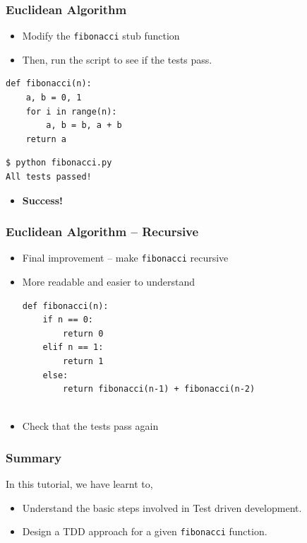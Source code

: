 \documentclass[12pt,presentation]{beamer}
\providecommand{\alert}[1]{\textbf{#1}}
\begin{document}
\begin{frame}[fragile]
  \frametitle{Euclidean Algorithm}
  \begin{itemize}
  \item Modify the \texttt{fibonacci} stub function
  \item Then, run the script to see if the tests pass.
  \end{itemize}
\begin{lstlisting}
def fibonacci(n):
    a, b = 0, 1
    for i in range(n):
        a, b = b, a + b
    return a

\end{lstlisting}
\begin{lstlisting}
$ python fibonacci.py
All tests passed!
\end{lstlisting} %
  \begin{itemize}
  \item \alert{Success!}
  \end{itemize}
\end{frame}

\begin{frame}[fragile]
  \frametitle{Euclidean Algorithm -- Recursive}
  \begin{itemize}
  \item Final improvement -- make \texttt{fibonacci} recursive
  \item More readable and easier to understand
\begin{lstlisting}
def fibonacci(n):
    if n == 0:
        return 0
    elif n == 1:
        return 1
    else:
        return fibonacci(n-1) + fibonacci(n-2)
        
\end{lstlisting}
  \item Check that the tests pass again
  \end{itemize}
\end{frame}


\begin{frame}
\frametitle{Summary}
\label{sec-8}

  In this tutorial, we have learnt to,


\begin{itemize}
\item Understand the basic steps involved in Test driven development.
\item Design a TDD approach for a given \texttt{fibonacci} function.

\end{itemize}
\end{frame}
\end{document}
